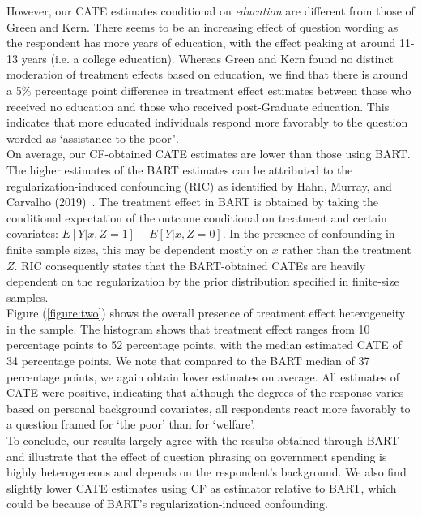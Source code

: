 \documentclass[12pt]{article}
\begin{document}
However, our CATE estimates conditional on \textit{education} are different from
those of Green and Kern. There seems to be an increasing effect of question
wording as the respondent has more years of education, with the effect peaking
at around 11-13 years (i.e. a college education). Whereas Green and Kern found
no distinct moderation of treatment effects based on education, we find that
there is around a 5\% percentage point difference in treatment effect estimates
between those who received no education and those who received post-Graduate
education. This indicates that more educated individuals respond more favorably
to the question worded as `assistance to the poor". \\

On average, our CF-obtained CATE estimates are lower than those using BART. The
higher estimates of the BART estimates can be attributed to the
regularization-induced confounding (RIC) as identified by Hahn, Murray, and
Carvalho (2019)~\cite{CarvalhoHahnMurray}. The treatment effect in BART is
obtained by taking the conditional expectation of the outcome conditional on
treatment and certain covariates: $E[Y|x,Z = 1] - E[Y|x,Z = 0]$. In the presence
of confounding in finite sample sizes, this may be dependent mostly on $x$
rather than the treatment $Z$. RIC consequently states that the BART-obtained
CATEs are heavily dependent on the regularization by the prior distribution
specified in finite-size samples. \\

Figure (\ref{figure:two}) shows the overall presence of treatment effect heterogeneity in the
sample. The histogram shows that treatment effect ranges from 10 percentage
points to 52 percentage points, with the median estimated CATE of 34 percentage
points. We note that compared to the BART median of 37 percentage points, we
again obtain lower estimates on average. All estimates of CATE were positive,
indicating that although the degrees of the response varies based on personal
background covariates, all respondents react more favorably to a question framed
for `the poor' than for `welfare'. \\

To conclude, our results largely agree with the results obtained through BART
and illustrate that the effect of question phrasing on government spending is
highly heterogeneous and depends on the respondent's background. We also find
slightly lower CATE estimates using CF as estimator relative to BART, which
could be because of BART's regularization-induced confounding. \\ 
\end{document}
